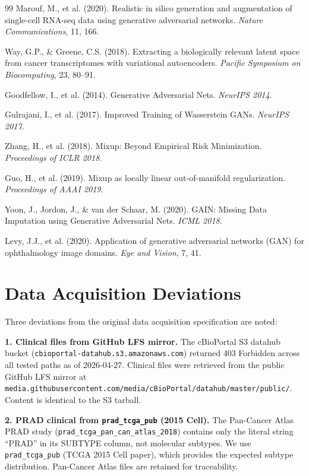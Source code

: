 \documentclass{article}
\begin{document}
\begin{thebibliography}{99}
Marouf, M., et al. (2020).
Realistic in silico generation and augmentation of single-cell RNA-seq data using generative
adversarial networks.
\textit{Nature Communications}, 11, 166.

Way, G.P., \& Greene, C.S. (2018).
Extracting a biologically relevant latent space from cancer transcriptomes with variational
autoencoders.
\textit{Pacific Symposium on Biocomputing}, 23, 80--91.

Goodfellow, I., et al. (2014).
Generative Adversarial Nets.
\textit{NeurIPS 2014}.

Gulrajani, I., et al. (2017).
Improved Training of Wasserstein GANs.
\textit{NeurIPS 2017}.

Zhang, H., et al. (2018).
Mixup: Beyond Empirical Risk Minimization.
\textit{Proceedings of ICLR 2018}.

Guo, H., et al. (2019).
Mixup as locally linear out-of-manifold regularization.
\textit{Proceedings of AAAI 2019}.

Yoon, J., Jordon, J., \& van der Schaar, M. (2020).
GAIN: Missing Data Imputation using Generative Adversarial Nets.
\textit{ICML 2018}.

Levy, J.J., et al. (2020).
Application of generative adversarial networks (GAN) for ophthalmology image domains.
\textit{Eye and Vision}, 7, 41.

\end{thebibliography}

\appendix

\section{Data Acquisition Deviations}
\label{app:data}

Three deviations from the original data acquisition specification are noted:

\textbf{1. Clinical files from GitHub LFS mirror.} The cBioPortal S3 datahub bucket
(\texttt{cbioportal-datahub.s3.amazonaws.com}) returned 403 Forbidden across all tested paths
as of 2026-04-27. Clinical files were retrieved from the public GitHub LFS mirror at
\texttt{media.githubusercontent.com/media/cBioPortal/datahub/master/public/}. Content is
identical to the S3 tarball.

\textbf{2. PRAD clinical from \texttt{prad\_tcga\_pub} (2015 Cell).} The Pan-Cancer Atlas PRAD
study (\texttt{prad\_tcga\_pan\_can\_atlas\_2018}) contains only the literal string ``PRAD'' in
its SUBTYPE column, not molecular subtypes. We use \texttt{prad\_tcga\_pub} (TCGA 2015 Cell
paper), which provides the expected subtype distribution. Pan-Cancer Atlas files are retained
for traceability.
\end{document}

